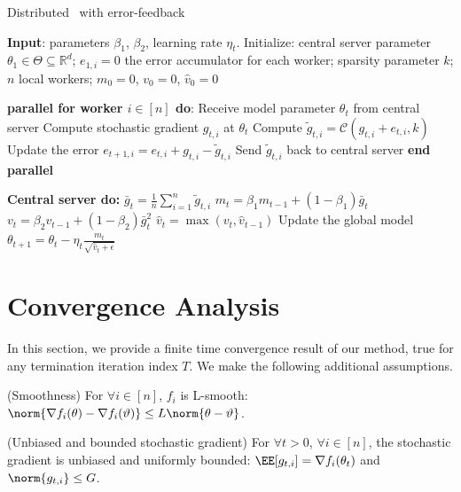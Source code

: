 \documentclass[11pt]{article}
\begin{document}
\begin{algorithm}[H]
\caption{Distributed \algo\ with error-feedback} \label{alg:sparsams}
\begin{algorithmic}[1]

\STATE \textbf{Input}: parameters $\beta_1$, $\beta_2$, learning rate $\eta_t$. 
\STATE Initialize: central server parameter $\theta_{1} \in \Theta \subseteq \mathbb R^d$; $e_{1,i}=0$ the error accumulator for each worker; sparsity parameter $k$; $n$ local workers; $m_0=0$, $v_0=0$, $\hat v_0=0$


\STATE\textbf{parallel for worker $i \in [n]$ do}:
\STATE\quad  Receive model parameter $\theta_{t}$ from central server
\STATE\quad  Compute stochastic gradient $g_{t,i}$ at $\theta_t$
\STATE\quad  Compute $\tilde g_{t,i}=\mathcal C(g_{t,i}+e_{t,i},k)$ \label{line:topk} 
\STATE\quad  Update the error $e_{t+1,i}=e_{t,i}+g_{t,i}-\tilde g_{t,i}$
\STATE\quad  Send $\tilde g_{t,i}$ back to central server
\STATE \textbf{end parallel}

\STATE \textbf{Central server do:}
\STATE $\bar g_{t}=\frac{1}{n}\sum_{i=1}^n \tilde g_{t,i}$
\STATE $m_t=\beta_1 m_{t-1}+(1-\beta_1)\bar g_t$
\STATE $v_t=\beta_2 v_{t-1}+(1-\beta_2)\bar g_t^2$
\STATE $\hat v_t=\max(v_t,\hat v_{t-1})$ \label{line:v}
\STATE Update the global model $\theta_{t+1}=\theta_{t}-\eta_t\frac{m_t}{\sqrt{\hat v_t+\epsilon}}$

\ENDFOR
\end{algorithmic}
\end{algorithm}


\section{Convergence Analysis}\label{sec:theory}

In this section, we provide a finite time convergence result of our method, true for any termination iteration index $T$.
We make the following additional assumptions.
\begin{assumption}\label{ass:smooth}(Smoothness)
For $\forall i \in [n]$, $f_i$ is  L-smooth: $\norm{\nabla f_i (\theta) - \nabla f_i (\vartheta)} \leq L \norm{\theta-\vartheta}$.
\end{assumption}

\begin{assumption}\label{ass:boundgrad}(Unbiased and bounded stochastic gradient)
For $\forall t >0$, $\forall i \in [n]$, the stochastic gradient is unbiased and uniformly bounded: $\EE[g_{t,i}] = \nabla f_i(\theta_t)$ and $\norm{g_{t,i}} \leq G$.
\end{assumption}
\end{document}
